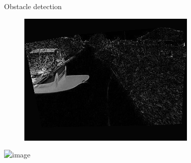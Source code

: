 \begin{frame}{Obstacle detection}
\begin{overlayarea}{\textwidth}{0.5\textheight}
{\begin{figure}
\begin{minipage}{0.3\textwidth}
	\end{minipage}
	\begin{minipage}{0.3\textwidth}
	  \includegraphics[width=\textwidth]{pca3}
	\end{minipage}
      \end{figure}
    }
    \begin{center}
      \includegraphics<3>[width=0.3\textwidth]{maskWarped}
    \end{center}
  \end{overlayarea}
\end{frame}

